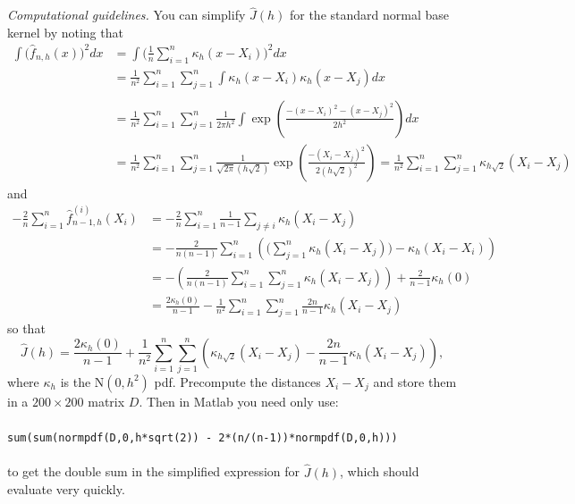 \documentclass[11pt]{report}
\begin{document}
\begin{enumerate}[1.]
          {\em Computational guidelines.}
          You can simplify $\widehat J(h)$ for the standard normal base kernel by noting that
          \begin{align*}
              \int \big(\widehat f_{n,h}(x)\big)^2 dx & = \int \Big(\frac{1}{n}\sum_{i=1}^n \kappa_h(x-X_i)\Big)^2 dx                                                                   \\
                                                      & = \frac{1}{n^2} \sum_{i=1}^n\sum_{j=1}^n \int \kappa_h(x-X_i)\kappa_h(x-X_j) dx                                                 \\
              \\ & = \frac{1}{n^2}\sum_{i=1}^n \sum_{j=1}^n \frac{1}{2\pi h^2} \int \exp\left(\frac{-(x-X_i)^2-(x-X_j)^2}{2h^2}\right) dx \\
                                                      & =  \frac{1}{n^2}\sum_{i=1}^n \sum_{j=1}^n \frac{1}{\sqrt{2\pi}(h\sqrt{2})} \exp\left(\frac{-(X_i-X_j)^2}{2(h\sqrt{2})^2}\right)
              = \frac{1}{n^2} \sum_{i=1}^n\sum_{j=1}^n \kappa_{h\sqrt{2}}(X_i-X_j)
          \end{align*}
          and
          \begin{align*}
              -\frac{2}{n} \sum_{i=1}^n \widehat f^{(i)}_{n-1,h}(X_i) & = -\frac{2}{n} \sum_{i=1}^n \frac{1}{n-1} \sum_{j\neq i} \kappa_h(X_i-X_j)                                   \\
                                                                      & = -\frac{2}{n(n-1)}\sum_{i=1}^n \left( \Big( \sum_{j=1}^n \kappa_h(X_i-X_j) \Big) - \kappa_h(X_i-X_i)\right) \\
                                                                      & = -\left(\frac{2}{n(n-1)} \sum_{i=1}^n \sum_{j=1}^n \kappa_h(X_i-X_j)\right) + \frac{2}{n-1}\kappa_h(0)      \\
                                                                      & = \frac{2\kappa_h(0)}{n-1}-\frac{1}{n^2} \sum_{i=1}^n \sum_{j=1}^n \frac{2n}{n-1}\kappa_h(X_i-X_j)
          \end{align*}
          so that
          \[ \widehat J(h) = \frac{2\kappa_h(0)}{n-1} + \frac{1}{n^2} \sum_{i=1}^n \sum_{j=1}^n \left( \kappa_{h\sqrt{2}}(X_i-X_j) - \frac{2n}{n-1}\kappa_h(X_i-X_j) \right)  , \]
          where $\kappa_h$ is the N$(0,h^2)$ pdf.
          Precompute the distances $X_i-X_j$ and store them in a $200\times 200$ matrix $D$.  Then in Matlab you need only use:
          \\ \\ {\tt sum(sum(normpdf(D,0,h*sqrt(2)) - 2*(n/(n-1))*normpdf(D,0,h)))}
          \\ \\ to get the double sum in the simplified expression for $\widehat J(h)$, which should evaluate very quickly.



\end{enumerate}
\end{document}
